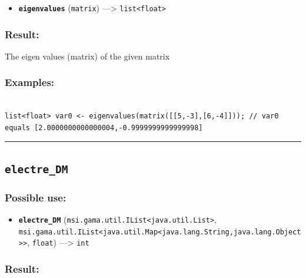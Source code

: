 \documentclass[]{book}
\providecommand{\tightlist}{%
  \setlength{\itemsep}{0pt}\setlength{\parskip}{0pt}}
\theoremstyle{definition}
\theoremstyle{definition}
\theoremstyle{definition}
\theoremstyle{remark}
\begin{document}
\begin{itemize}
\tightlist
\item
  \textbf{\texttt{eigenvalues}} (\texttt{matrix}) ---\textgreater{}
  \texttt{list\textless{}float\textgreater{}}
\end{itemize}

\subsubsection{Result:}\label{result-142}

The eigen values (matrix) of the given matrix

\subsubsection{Examples:}\label{examples-111}

\begin{verbatim}
 
list<float> var0 <- eigenvalues(matrix([[5,-3],[6,-4]])); // var0 equals [2.0000000000000004,-0.9999999999999998]
\end{verbatim}

\begin{center}\rule{0.5\linewidth}{\linethickness}\end{center}

\subsection{\texorpdfstring{\texttt{electre\_DM}}{electre\_DM}}\label{electre_dm}

\subsubsection{Possible use:}\label{possible-use-149}

\begin{itemize}
\tightlist
\item
  \textbf{\texttt{electre\_DM}}
  (\texttt{msi.gama.util.IList\textless{}java.util.List\textgreater{}},
  \texttt{msi.gama.util.IList\textless{}java.util.Map\textless{}java.lang.String,java.lang.Object\textgreater{}\textgreater{}},
  \texttt{float}) ---\textgreater{} \texttt{int}
\end{itemize}

\subsubsection{Result:}\label{result-143}
\end{document}
